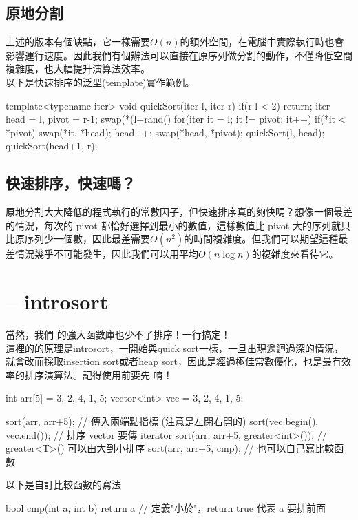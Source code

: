 \documentclass[main.tex]{subfiles}
\begin{document}
\subsection{原地分割}
上述的版本有個缺點，它一樣需要$O(n)$的額外空間，在電腦中實際執行時也會影響運行速度。因此我們有個辦法可以直接在原序列做分割的動作，不僅降低空間複雜度，也大幅提升演算法效率。\\
以下是快速排序的泛型(template)實作範例。
\begin{C++}
template<typename iter>
void quickSort(iter l, iter r){
    if(r-l < 2) return;
    iter head = l, pivot = r-1;
    swap(*(l+rand()%
    for(iter it = l; it != pivot; it++){
        if(*it < *pivot){
            swap(*it, *head);
            head++;
        }
    }
    swap(*head, *pivot);
    quickSort(l, head);
    quickSort(head+1, r);
}
\end{C++}
\subsection{快速排序，快速嗎？}
原地分割大大降低的程式執行的常數因子，但快速排序真的夠快嗎？想像一個最差的情況，每次的 pivot 都恰好選擇到最小的數值，這樣數值比 pivot 大的序列就只比原序列少一個數，因此最差需要$O(n^2)$的時間複雜度。但我們可以期望這種最差情況幾乎不可能發生，因此我們可以用平均$O(n\log n)$的複雜度來看待它。
\section{ -- introsort}
當然，我們  的強大函數庫也少不了排序！一行搞定！\\
這裡的的原理是introsort，一開始與quick sort一樣，一旦出現遞迴過深的情況，就會改而採取insertion sort或者heap sort，因此是經過極佳常數優化，也是最有效率的排序演算法。記得使用前要先  唷！
\begin{C++}
int arr[5] = {3, 2, 4, 1, 5};
vector<int> vec = {3, 2, 4, 1, 5};

sort(arr, arr+5);
// 傳入兩端點指標 (注意是左閉右開的)
sort(vec.begin(), vec.end());
// 排序 vector 要傳 iterator
sort(arr, arr+5, greater<int>());
// greater<T>() 可以由大到小排序
sort(arr, arr+5, cmp);
// 也可以自己寫比較函數
\end{C++}
\indent\indent 以下是自訂比較函數的寫法
\begin{C++}
bool cmp(int a, int b){
    return a%
}
// 定義"小於"，return true 代表 a 要排前面
\end{C++}
\end{document}
